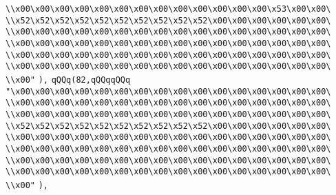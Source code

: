 \verb|\\x00\x00\x00\x00\x00\x00\x00\x00\x00\x00\x00\x00\x00\x53\x00\x00\|\newline
\verb|\\x52\x52\x52\x52\x52\x52\x52\x52\x52\x52\x00\x00\x00\x00\x00\x00\|\newline
\verb|\\x00\x00\x00\x00\x00\x00\x00\x00\x00\x00\x00\x00\x00\x00\x00\x00\|\newline
\verb|\\x00\x00\x00\x00\x00\x00\x00\x00\x00\x00\x00\x00\x00\x00\x00\x00\|\newline
\verb|\\x00\x00\x00\x00\x00\x00\x00\x00\x00\x00\x00\x00\x00\x00\x00\x00\|\newline
\verb|\\x00\x00\x00\x00\x00\x00\x00\x00\x00\x00\x00\x00\x00\x00\x00\x00\|\newline
\verb|\\x00"|\newline
\verb|),|\newline
\verb|qQQq(82,qQQqqQQq|\newline
\verb|"\x00\x00\x00\x00\x00\x00\x00\x00\x00\x00\x00\x00\x00\x00\x00\x00\|\newline
\verb|\\x00\x00\x00\x00\x00\x00\x00\x00\x00\x00\x00\x00\x00\x00\x00\x00\|\newline
\verb|\\x00\x00\x00\x00\x00\x00\x00\x00\x00\x00\x00\x00\x00\x00\x00\x00\|\newline
\verb|\\x52\x52\x52\x52\x52\x52\x52\x52\x52\x52\x00\x00\x00\x00\x00\x00\|\newline
\verb|\\x00\x00\x00\x00\x00\x00\x00\x00\x00\x00\x00\x00\x00\x00\x00\x00\|\newline
\verb|\\x00\x00\x00\x00\x00\x00\x00\x00\x00\x00\x00\x00\x00\x00\x00\x00\|\newline
\verb|\\x00\x00\x00\x00\x00\x00\x00\x00\x00\x00\x00\x00\x00\x00\x00\x00\|\newline
\verb|\\x00\x00\x00\x00\x00\x00\x00\x00\x00\x00\x00\x00\x00\x00\x00\x00\|\newline
\verb|\\x00"|\newline
\verb|),|\newline
